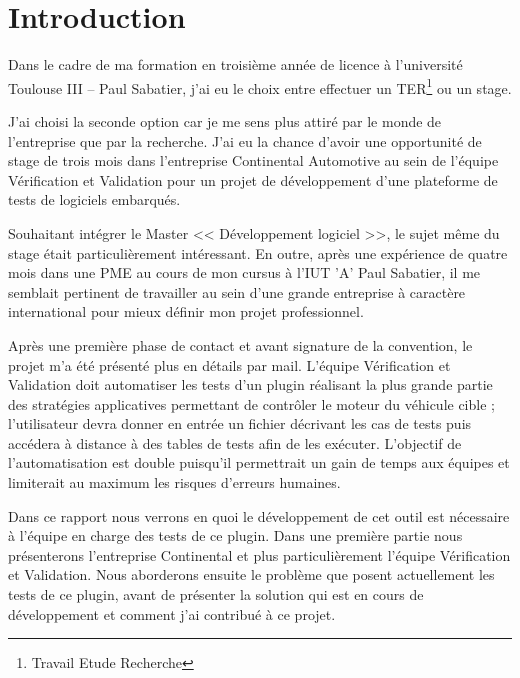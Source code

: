 \chapter*{Introduction}
Dans le cadre de ma formation en troisième année de licence à l'université Toulouse III – Paul Sabatier, j'ai eu le choix entre effectuer un TER\footnote{Travail Etude Recherche} ou un stage. 

J'ai choisi la seconde option car je me sens plus attiré par le monde de l'entreprise que par la recherche. J'ai eu la chance d'avoir une opportunité de stage de trois mois dans l'entreprise Continental Automotive au sein de l'équipe Vérification et Validation pour un projet de développement d'une plateforme de tests de logiciels embarqués.

Souhaitant intégrer le Master << Développement logiciel >>, le sujet même du stage était particulièrement intéressant. En outre, après une expérience de quatre mois dans une PME au cours de mon cursus à l'IUT 'A' Paul Sabatier, il me semblait pertinent de travailler au sein d'une grande entreprise à caractère international pour mieux définir mon projet professionnel.

Après une première phase de contact et avant signature de la convention, le projet m'a été présenté plus en détails par mail. L'équipe Vérification et Validation doit automatiser les tests d'un plugin réalisant la plus grande partie des stratégies applicatives permettant de contrôler le moteur du véhicule cible ; l'utilisateur devra donner en entrée un fichier décrivant les cas de tests puis accédera à distance à des tables de tests afin de les exécuter. L'objectif de l'automatisation est double puisqu'il permettrait un gain de temps aux équipes et limiterait au maximum les risques d'erreurs humaines.

Dans ce rapport nous verrons en quoi le développement de cet outil est nécessaire à l'équipe en charge des tests de ce plugin. Dans une première partie nous présenterons l'entreprise Continental et plus particulièrement l'équipe Vérification et Validation. Nous aborderons ensuite le problème que posent actuellement les tests de ce plugin, avant de présenter la solution qui est en cours de développement et comment j'ai contribué à ce projet.
